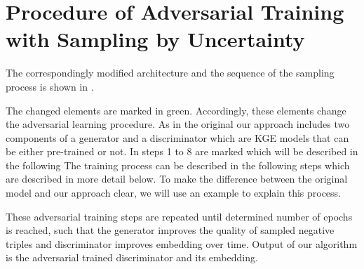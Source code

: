 \section{Procedure of Adversarial Training with Sampling by Uncertainty}
\label{sec:procedure}
%
The correspondingly modified architecture and the sequence of the sampling process is shown in .

The changed elements are marked in green.
Accordingly, these elements change the adversarial learning procedure.
As in the original \kbgan our approach includes two components of a generator and a discriminator which are \ac{KGE} models that can be either pre-trained or not.
In  steps 1 to 8 are marked which will be described in the following 
The training process can be described in the following steps
which are described in more detail below.
To make the difference between the original model and our approach clear, we will use an example to explain this process.

















These adversarial training steps are repeated until determined number of epochs is reached, such that the generator improves the quality of sampled negative triples and discriminator improves embedding over time.
Output of our algorithm is the adversarial trained discriminator and its embedding.




